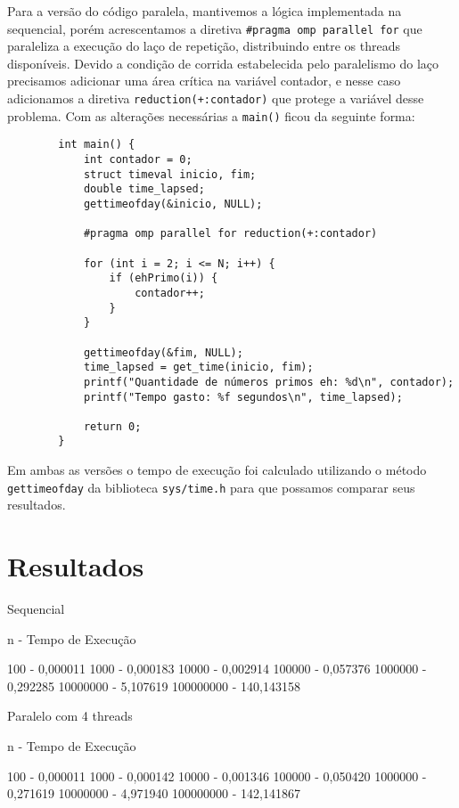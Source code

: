 \documentclass[a4paper, 12pt]{article}
\begin{document}
	Para a versão do código paralela, mantivemos a lógica implementada na sequencial, porém acrescentamos a diretiva \texttt{\#pragma omp parallel for} que paraleliza a execução do laço de repetição, distribuindo entre os threads disponíveis. Devido a condição de corrida estabelecida pelo paralelismo do laço precisamos adicionar uma área crítica na variável contador, e nesse caso adicionamos a diretiva \texttt{reduction(+:contador)} que protege a variável desse problema. Com as alterações necessárias a \texttt{main()} ficou da seguinte forma:
	
	\begin{verbatim}
		int main() {
		    int contador = 0;
		    struct timeval inicio, fim;
		    double time_lapsed;
		    gettimeofday(&inicio, NULL);
		    
		    #pragma omp parallel for reduction(+:contador)
		    
		    for (int i = 2; i <= N; i++) {
		        if (ehPrimo(i)) {
		            contador++;
		        }
		    }
			
		    gettimeofday(&fim, NULL); 
		    time_lapsed = get_time(inicio, fim);
		    printf("Quantidade de números primos eh: %d\n", contador);
		    printf("Tempo gasto: %f segundos\n", time_lapsed);
			
		    return 0;
		}
	\end{verbatim}
	
	
	Em ambas as versões o tempo de execução foi calculado utilizando o método \texttt{gettimeofday} da biblioteca \texttt{sys/time.h} para que possamos comparar seus resultados.
	
	\section{Resultados}
	
	Sequencial
	
	n - Tempo de Execução
	
	100 - 0,000011
	1000 - 0,000183
	10000 - 0,002914
	100000 - 0,057376
	1000000 - 0,292285
	10000000 - 5,107619
	100000000 - 140,143158
	
	Paralelo com 4 threads
	
	n - Tempo de Execução
	
	100 - 0,000011
	1000 - 0,000142
	10000 - 0,001346
	100000 - 0,050420
	1000000 - 0,271619
	10000000 - 4,971940
	100000000 - 142,141867
	
\end{document}
